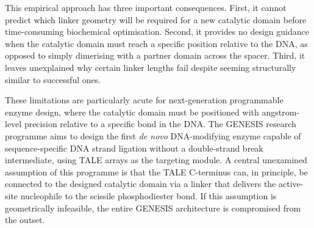 \documentclass[11pt,a4paper]{article}
\begin{document}
This empirical approach has three important consequences. First, it cannot predict
which linker geometry will be required for a new catalytic domain before
time-consuming biochemical optimisation. Second, it provides no design guidance when
the catalytic domain must reach a specific position relative to the DNA, as opposed
to simply dimerising with a partner domain across the spacer. Third, it leaves
unexplained why certain linker lengths fail despite seeming structurally similar
to successful ones.

These limitations are particularly acute for next-generation programmable enzyme design,
where the catalytic domain must be positioned with angstrom-level precision relative
to a specific bond in the DNA. The GENESIS research programme aims to design the
first \textit{de novo} DNA-modifying enzyme capable of sequence-specific DNA strand
ligation without a double-strand break intermediate, using TALE arrays as the
targeting module. A central unexamined assumption of this programme is that the
TALE C-terminus can, in principle, be connected to the designed catalytic domain
via a linker that delivers the active-site nucleophile to the scissile phosphodiester
bond. If this assumption is geometrically infeasible, the entire GENESIS architecture
is compromised from the outset.
\end{document}
